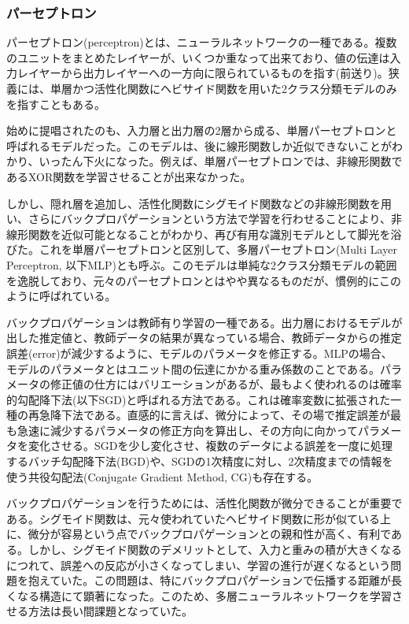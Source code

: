 \subsubsection{パーセプトロン}
パーセプトロン(perceptron)とは、ニューラルネットワークの一種である。複数のユニットをまとめたレイヤーが、いくつか重なって出来ており、値の伝達は入力レイヤーから出力レイヤーへの一方向に限られているものを指す(前送り)。狭義には、単層かつ活性化関数にヘビサイド関数を用いた2クラス分類モデルのみを指すこともある。\par
始めに提唱されたのも、入力層と出力層の2層から成る、単層パーセプトロンと呼ばれるモデルだった\cite{rosenblatt1958perceptron}。このモデルは、後に線形関数しか近似できないことがわかり、いったん下火になった\cite{minsky1988perceptrons:}。例えば、単層パーセプトロンでは、非線形関数であるXOR関数を学習させることが出来なかった。\par
しかし、隠れ層を追加し、活性化関数にシグモイド関数などの非線形関数を用い、さらにバックプロパゲーションという方法で学習を行わせることにより、非線形関数を近似可能となることがわかり、再び有用な識別モデルとして脚光を浴びた\cite{rumelhart1986learning}\cite{funahashi1989on-the-approximate}。これを単層パーセプトロンと区別して、多層パーセプトロン(Multi Layer Perceptron, 以下MLP)とも呼ぶ。このモデルは単純な2クラス分類モデルの範囲を逸脱しており、元々のパーセプトロンとはやや異なるものだが、慣例的にこのように呼ばれている。\par
バックプロパゲーションは教師有り学習の一種である。出力層におけるモデルが出した推定値と、教師データの結果が異なっている場合、教師データからの推定誤差(error)が減少するように、モデルのパラメータを修正する。MLPの場合、モデルのパラメータとはユニット間の伝達にかかる重み係数のことである。パラメータの修正値の仕方にはバリエーションがあるが、最もよく使われるのは確率的勾配降下法(以下SGD)と呼ばれる方法である。これは確率変数に拡張された一種の再急降下法である。直感的に言えば、微分によって、その場で推定誤差が最も急速に減少するパラメータの修正方向を算出し、その方向に向かってパラメータを変化させる。SGDを少し変化させ、複数のデータによる誤差を一度に処理するバッチ勾配降下法(BGD)や、SGDの1次精度に対し、2次精度までの情報を使う共役勾配法(Conjugate Gradient Method, CG)も存在する。\par
バックプロパゲーションを行うためには、活性化関数が微分できることが重要である。シグモイド関数は、元々使われていたヘビサイド関数に形が似ている上に、微分が容易という点でバックプロパゲーションとの親和性が高く、有利である。しかし、シグモイド関数のデメリットとして、入力と重みの積が大きくなるにつれて、誤差への反応が小さくなってしまい、学習の進行が遅くなるという問題を抱えていた。この問題は、特にバックプロパゲーションで伝播する距離が長くなる構造にて顕著になった\cite{hochreiter1998the-vanishing}\cite{hochreiter1998the-vanishing}。このため、多層ニューラルネットワークを学習させる方法は長い間課題となっていた。